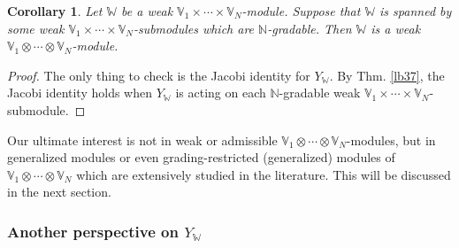 \documentclass[11pt,b5paper,notitlepage]{article}
\theoremstyle{definition}
\theoremstyle{plain}
\newtheorem{co}[df]{Corollary}
\newcommand{\Vbb}{\mathbb V}
\newcommand{\Wbb}{\mathbb W}
\newcommand{\Nbb}{\mathbb N}
\newcommand{\<}{\left\langle}
\renewcommand{\>}{\right\rangle}
\numberwithin{equation}{section}
\begin{document}
\begin{co}\label{lb38}
Let $\Wbb$ be a weak $\Vbb_1\times\cdots\times\Vbb_N$-module. Suppose that $\Wbb$ is spanned by some weak  $\Vbb_1\times\cdots\times\Vbb_N$-submodules which are $\Nbb$-gradable. Then $\Wbb$ is a weak $\Vbb_1\otimes\cdots\otimes\Vbb_N$-module.
\end{co}

\begin{proof}
The only thing to check is the Jacobi identity for $Y_\Wbb$. By Thm. \ref{lb37}, the Jacobi identity holds when $Y_\Wbb$ is acting on each $\Nbb$-gradable weak $\Vbb_1\times\cdots\times\Vbb_N$-submodule.
\end{proof}

Our ultimate interest is not in weak or admissible $\Vbb_1\otimes\cdots\otimes\Vbb_N$-modules, but in generalized modules or even grading-restricted (generalized) modules of $\Vbb_1\otimes\cdots\otimes\Vbb_N$ which are extensively studied in the literature. This will be discussed in the next section.








\subsubsection{Another perspective on $Y_\Wbb$}\label{lb28}
\end{document}
